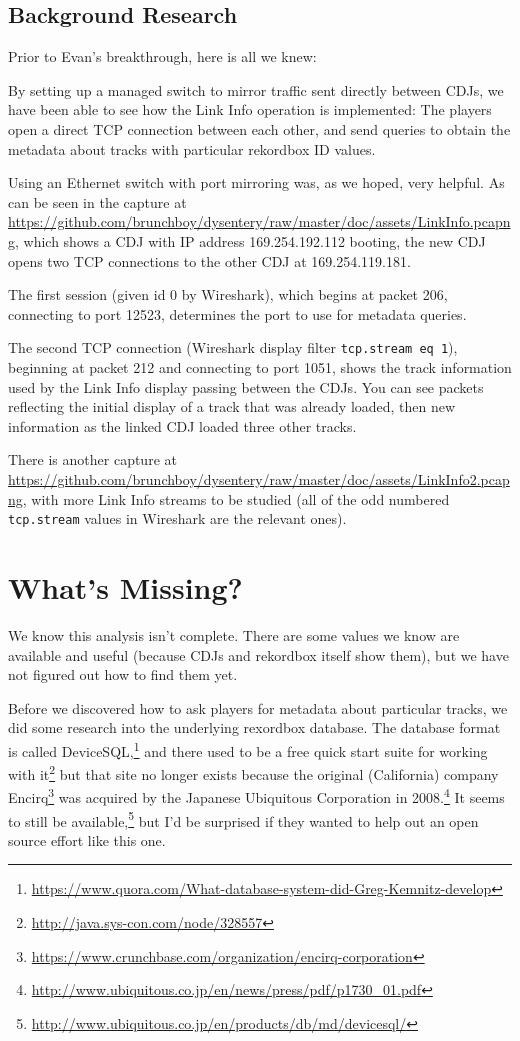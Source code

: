\documentclass[11pt]{article}
\begin{document}
\subsection{Background Research}

Prior to Evan's breakthrough, here is all we knew:

By setting up a managed switch to mirror traffic sent directly between
CDJs, we have been able to see how the Link Info operation is
implemented: The players open a direct TCP connection between each
other, and send queries to obtain the metadata about tracks with
particular rekordbox ID values.

Using an Ethernet switch
with port mirroring was, as we hoped, very helpful. As can be seen in
the capture at
\url{https://github.com/brunchboy/dysentery/raw/master/doc/assets/LinkInfo.pcapng},
which shows a CDJ with IP address 169.254.192.112 booting, the new CDJ
opens two TCP connections to the other CDJ at 169.254.119.181.

The first session (given id 0 by Wireshark), which begins at packet
206, connecting to port 12523, determines the port to use for metadata
queries.

The second TCP connection (Wireshark display filter {\tt tcp.stream eq
  1}), beginning at packet 212 and connecting to port 1051, shows the
track information used by the Link Info display passing between the
CDJs. You can see packets reflecting the initial display of a track
that was already loaded, then new information as the linked CDJ loaded
three other tracks.

There is another capture at
\url{https://github.com/brunchboy/dysentery/raw/master/doc/assets/LinkInfo2.pcapng},
with more Link Info streams to be studied (all of the odd numbered
{\tt tcp.stream} values in Wireshark are the relevant ones).

\section{What's Missing?}

We know this analysis isn't complete. There are some values we know
are available and useful (because CDJs and rekordbox itself show
them), but we have not figured out how to find them yet.

Before we discovered how to ask players for metadata about
particular tracks, we did some research into the underlying rexordbox
database. The database format is called
DeviceSQL,\footnote{\url{https://www.quora.com/What-database-system-did-Greg-Kemnitz-develop}}
and there used to be a free quick start suite for working with
it\footnote{\url{http://java.sys-con.com/node/328557}} but that site
no longer exists because the original (California) company
Encirq\footnote{\url{https://www.crunchbase.com/organization/encirq-corporation}}
was acquired by the Japanese Ubiquitous Corporation in
2008.\footnote{\url{http://www.ubiquitous.co.jp/en/news/press/pdf/p1730_01.pdf}}
It seems to still be
available,\footnote{\url{http://www.ubiquitous.co.jp/en/products/db/md/devicesql/}}
but I'd be surprised if they wanted to help out an open source effort
like this one.
\end{document}
